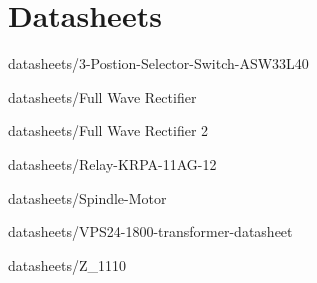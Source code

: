 \appendix
\chapter{Datasheets}


            {datasheets/3-Postion-Selector-Switch-ASW33L40}

            {datasheets/Full Wave Rectifier}

            {datasheets/Full Wave Rectifier 2}

            {datasheets/Relay-KRPA-11AG-12}

            {datasheets/Spindle-Motor}

            {datasheets/VPS24-1800-transformer-datasheet}

            {datasheets/Z_1110}
